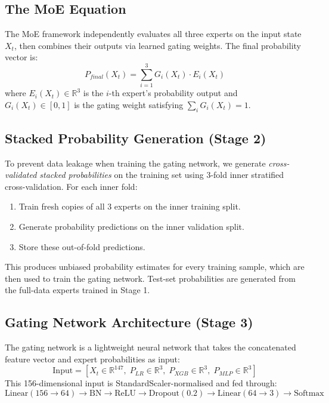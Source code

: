 \documentclass[conference]{IEEEtran}
\begin{document}
\subsection{The MoE Equation}
The MoE framework independently evaluates all three experts on the input
state $X_t$, then combines their outputs via learned gating weights. The
final probability vector is:
\begin{equation}
    P_{final}(X_t) = \sum_{i=1}^{3} G_i(X_t) \cdot E_i(X_t)
\end{equation}
where $E_i(X_t) \in \mathbb{R}^3$ is the $i$-th expert's probability
output and $G_i(X_t) \in [0,1]$ is the gating weight satisfying
$\sum_i G_i(X_t) = 1$.

\subsection{Stacked Probability Generation (Stage 2)}
To prevent data leakage when training the gating network, we generate
\textit{cross-validated stacked probabilities} on the training set using
3-fold inner stratified cross-validation. For each inner fold:
\begin{enumerate}
    \item Train fresh copies of all 3 experts on the inner training split.
    \item Generate probability predictions on the inner validation split.
    \item Store these out-of-fold predictions.
\end{enumerate}
This produces unbiased probability estimates for every training sample,
which are then used to train the gating network. Test-set probabilities
are generated from the full-data experts trained in Stage 1.

\subsection{Gating Network Architecture (Stage 3)}
The gating network is a lightweight neural network that takes the
concatenated feature vector and expert probabilities as input:
\begin{equation*}
    \text{Input} = [X_t \in \mathbb{R}^{147}, \; P_{LR} \in \mathbb{R}^3, \; P_{XGB} \in \mathbb{R}^3, \; P_{MLP} \in \mathbb{R}^3]
\end{equation*}
This 156-dimensional input is StandardScaler-normalised and fed through:
\begin{equation*}
    \text{Linear}(156 \rightarrow 64) \rightarrow \text{BN} \rightarrow \text{ReLU} \rightarrow \text{Dropout}(0.2) \rightarrow \text{Linear}(64 \rightarrow 3) \rightarrow \text{Softmax}
\end{equation*}
\end{document}
